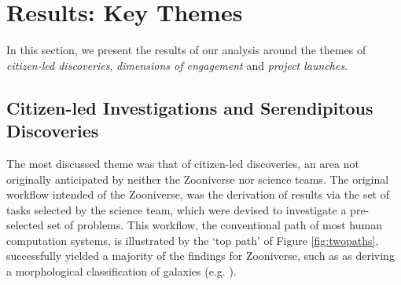 \documentclass{sigchi}
\begin{document}

\section{Results: Key Themes}
In this section, we present the results of our analysis around the themes of \emph{citizen-led discoveries}, \emph{dimensions of engagement} and \emph{project launches}.

\subsection{Citizen-led Investigations and Serendipitous Discoveries}

The most discussed theme was that of citizen-led discoveries, an area not originally anticipated by neither the Zooniverse nor science teams.  The original workflow intended of the Zooniverse, was the derivation of results via the set of tasks selected by the science team, which were devised to investigate a pre-selected set of problems.  This workflow, the conventional path of most human computation systems, is illustrated by the `top path' of Figure \ref{fig:twopaths}, successfully yielded a majority of the findings for Zooniverse, such as as deriving a morphological classification of galaxies (e.g. \cite{fortson2011galaxy}).   
\end{document}
